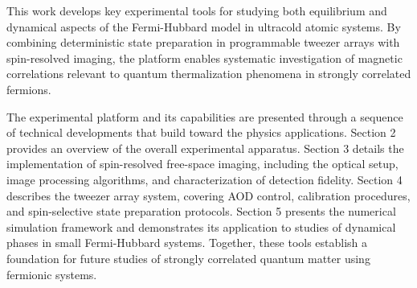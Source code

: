 This work develops key experimental tools for studying both equilibrium and dynamical aspects of the Fermi-Hubbard model in ultracold atomic systems. By combining deterministic state preparation in programmable tweezer arrays with spin-resolved imaging, the platform enables systematic investigation of magnetic correlations relevant to quantum thermalization phenomena in strongly correlated fermions.

The experimental platform and its capabilities are presented through a sequence of technical developments that build toward the physics applications. Section 2 provides an overview of the overall experimental apparatus. Section 3 details the implementation of spin-resolved free-space imaging, including the optical setup, image processing algorithms, and characterization of detection fidelity. Section 4 describes the tweezer array system, covering AOD control, calibration procedures, and spin-selective state preparation protocols. Section 5 presents the numerical simulation framework and demonstrates its application to studies of dynamical phases in small Fermi-Hubbard systems. Together, these tools establish a foundation for future studies of strongly correlated quantum matter using fermionic systems.